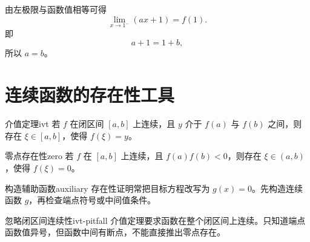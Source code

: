 \documentclass[UTF8,zihao=-4,scheme=chinese,fontset=windows]{ctexart}
\begin{document}
\begin{solutionbox}
由左极限与函数值相等可得
\[
  \lim_{x\to 1^-}(ax+1)=f(1).
\]
即
\[
  a+1=1+b,
\]
所以 $a=b$。
\end{solutionbox}

\section{连续函数的存在性工具}

\begin{theorem}{介值定理}{ivt}
若 $f$ 在闭区间 $[a,b]$ 上连续，且 $y$ 介于 $f(a)$ 与 $f(b)$ 之间，则存在 $\xi\in[a,b]$，使得 $f(\xi)=y$。
\end{theorem}

\begin{lemma}{零点存在性}{zero}
若 $f$ 在 $[a,b]$ 上连续，且 $f(a)f(b)<0$，则存在 $\xi\in(a,b)$，使得 $f(\xi)=0$。
\end{lemma}

\begin{hint}{构造辅助函数}{auxiliary}
存在性证明常把目标方程改写为 $g(x)=0$。先构造连续函数 $g$，再检查端点符号或中间值条件。
\end{hint}

\begin{pitfall}{忽略闭区间连续性}{ivt-pitfall}
介值定理要求函数在整个闭区间上连续。只知道端点函数值异号，但函数中间有断点，不能直接推出零点存在。
\end{pitfall}



\end{document}
